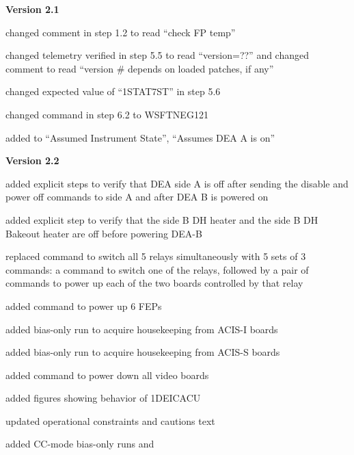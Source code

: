 \documentclass[11pt]{article}
\begin{document}
\item {\bf Version 2.1}
\bi
\item changed comment in step 1.2 to read ``check FP temp''
\item changed telemetry verified in step 5.5 to read ``version=??''
  and changed comment to read ``version \# depends on loaded patches,
  if any''
\item changed expected value of ``1STAT7ST'' in step 5.6
\item changed command in step 6.2 to WSFTNEG121
\item added to ``Assumed Instrument State'', ``Assumes DEA A is on''
\ei

\item {\bf Version 2.2}
\bi
\item added explicit steps to verify that DEA side A is off after sending the
disable and power off commands to side A and after DEA B is powered on
\item added explicit step to verify that the side B DH heater and the side B 
DH Bakeout heater are off before powering DEA-B
\item replaced command to switch all 5 relays simultaneously with 5 sets of 3 
commands: a command to switch one of the relays, followed by a pair of commands
to power up each of the two boards controlled by that relay
\item added command to power up 6 FEPs
\item added bias-only run to acquire housekeeping from ACIS-I boards
\item added bias-only run to acquire housekeeping from ACIS-S boards
\item added command to power down all video boards
\item added figures showing behavior of 1DEICACU
\item updated operational constraints and cautions text
\item added CC-mode bias-only runs
and 
\ei
\ed
\end{document}
